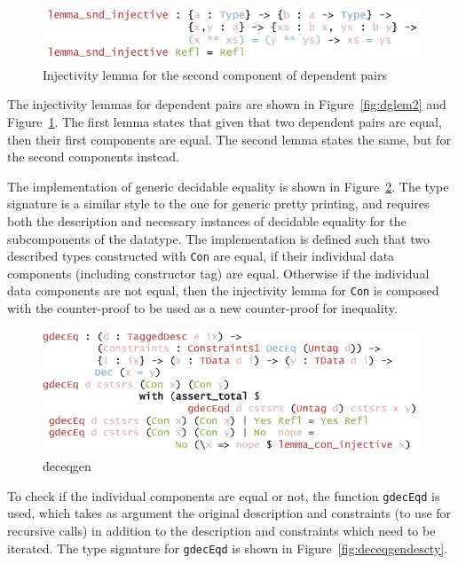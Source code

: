 \documentclass{ituthesis}
\newcommand{\ttconstructor}[1]{\textcolor{constructor-color}{\texttt{#1}}}
\newcommand{\ttdec}[1]{\textcolor{declared-var-color}{\texttt{#1}}}
\theoremstyle{break}
\begin{document}
\begin{figure}[ht]
\begin{center}
    \includegraphics[scale=0.5]{Figures/GenericDecEqLemma3.png}
\end{center}
\caption{Injectivity lemma for the second component of dependent pairs}
\label{fig:dglem3}
\end{figure}

The injectivity lemmas for dependent pairs are shown in Figure~\ref{fig:dglem2} and Figure~\ref{fig:dglem3}.
The first lemma states that given that two dependent pairs are equal, then their first components are equal.
The second lemma states the same, but for the second components instead.

The implementation of generic decidable equality is shown in Figure~\ref{fig:deceqgen}.
The type signature is a similar style to the one for generic pretty printing, and requires both the description
and necessary instances of decidable equality for the subcomponents of the datatype.
The implementation is defined such that two described types constructed with \ttconstructor{Con} are equal, if their individual data components (including constructor tag) are equal.
Otherwise if the individual data components are not equal, then the injectivity lemma for \ttconstructor{Con} is composed with the counter-proof to be used as a new counter-proof for inequality.

\begin{figure}[ht]
\begin{center}
    \includegraphics[scale=0.5]{Figures/GenericDecEq.png}
\end{center}
\caption{deceqgen}
\label{fig:deceqgen}
\end{figure}

To check if the individual components are equal or not, the function \ttdec{gdecEqd} is used, which takes as argument the original description and constraints (to use for recursive calls)
in addition to the description and constraints which need to be iterated.
The type signature for \ttdec{gdecEqd} is shown in Figure~\ref{fig:deceqgendescty}.
\end{document}
